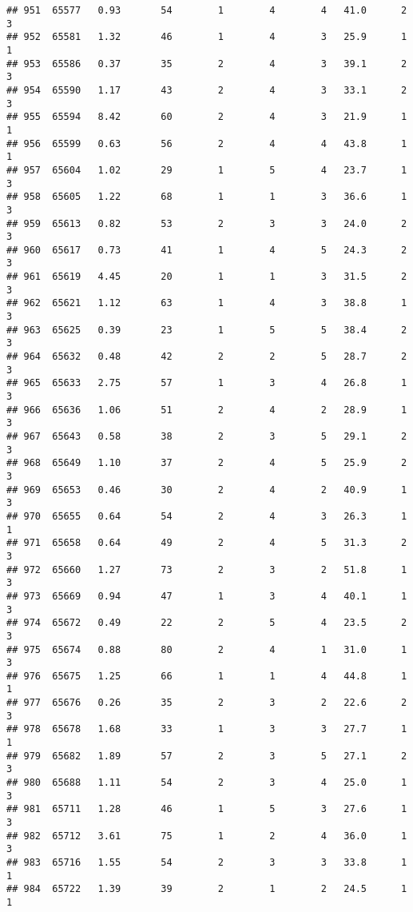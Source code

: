 \documentclass[
]{article}
\begin{document}
\begin{verbatim}
## 951  65577   0.93       54        1        4        4   41.0      2      3
## 952  65581   1.32       46        1        4        3   25.9      1      1
## 953  65586   0.37       35        2        4        3   39.1      2      3
## 954  65590   1.17       43        2        4        3   33.1      2      3
## 955  65594   8.42       60        2        4        3   21.9      1      1
## 956  65599   0.63       56        2        4        4   43.8      1      1
## 957  65604   1.02       29        1        5        4   23.7      1      3
## 958  65605   1.22       68        1        1        3   36.6      1      3
## 959  65613   0.82       53        2        3        3   24.0      2      3
## 960  65617   0.73       41        1        4        5   24.3      2      3
## 961  65619   4.45       20        1        1        3   31.5      2      3
## 962  65621   1.12       63        1        4        3   38.8      1      3
## 963  65625   0.39       23        1        5        5   38.4      2      3
## 964  65632   0.48       42        2        2        5   28.7      2      3
## 965  65633   2.75       57        1        3        4   26.8      1      3
## 966  65636   1.06       51        2        4        2   28.9      1      3
## 967  65643   0.58       38        2        3        5   29.1      2      3
## 968  65649   1.10       37        2        4        5   25.9      2      3
## 969  65653   0.46       30        2        4        2   40.9      1      3
## 970  65655   0.64       54        2        4        3   26.3      1      1
## 971  65658   0.64       49        2        4        5   31.3      2      3
## 972  65660   1.27       73        2        3        2   51.8      1      3
## 973  65669   0.94       47        1        3        4   40.1      1      3
## 974  65672   0.49       22        2        5        4   23.5      2      3
## 975  65674   0.88       80        2        4        1   31.0      1      3
## 976  65675   1.25       66        1        1        4   44.8      1      1
## 977  65676   0.26       35        2        3        2   22.6      2      3
## 978  65678   1.68       33        1        3        3   27.7      1      1
## 979  65682   1.89       57        2        3        5   27.1      2      3
## 980  65688   1.11       54        2        3        4   25.0      1      3
## 981  65711   1.28       46        1        5        3   27.6      1      3
## 982  65712   3.61       75        1        2        4   36.0      1      3
## 983  65716   1.55       54        2        3        3   33.8      1      1
## 984  65722   1.39       39        2        1        2   24.5      1      1

\end{verbatim}
\end{document}
